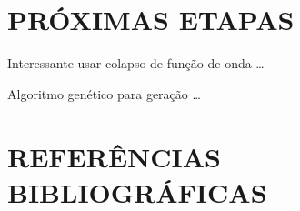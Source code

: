 \documentclass[12pt]{article}
\begin{document}
\section{PRÓXIMAS ETAPAS}

Interessante usar colapso de função de onda \ldots

Algoritmo genético para geração \ldots


\section{REFERÊNCIAS BIBLIOGRÁFICAS}



\end{document}
